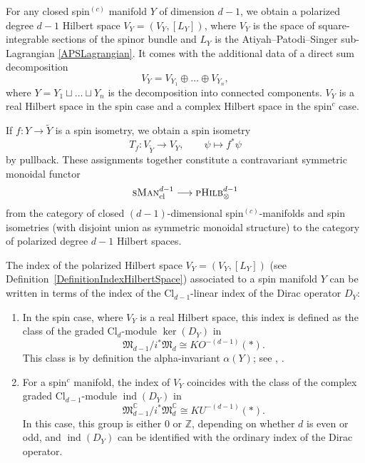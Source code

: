 \documentclass[10pt,a4paper]{amsart}
\numberwithin{equation}{section}
\newcommand{\pHilb}{\textsc{pHilb}}
\newcommand{\Z}{\mathbb{Z}}
\newcommand{\C}{\mathbb{C}}
\newcommand{\ind}{\operatorname{ind}}
\newcommand{\Cl}{\mathrm{Cl}}
\begin{document}
\begin{Construction} \label{ConstructionVX}
For any closed spin$^{(c)}$ manifold $Y$ of dimension $d-1$, we obtain a polarized degree $d-1$ Hilbert space $V_Y = (V_Y, [L_Y])$, where $V_Y$ is the space of square-integrable sections of the spinor bundle and $L_Y$ is the Atiyah--Patodi--Singer sub-Lagrangian \eqref{APSLagrangian}.
It comes with the additional data of a direct sum decomposition
\begin{equation}
\label{ObservationMonoidality}
 V_Y = V_{Y_1} \oplus \dots \oplus V_{Y_n},
\end{equation}
where $Y = Y_1 \sqcup \dots \sqcup Y_n$ is the decomposition into connected components.
$V_Y$ is a real Hilbert space in the spin case and a complex Hilbert space in the spin$^c$ case.

If $f\colon Y \to \tilde{Y}$ is a spin isometry, we obtain a spin isometry
\begin{equation}
\label{InducedIsomorphism}
 T_f\colon V_{\tilde{Y}} \to V_Y, \qquad \psi \longmapsto f^*\psi
\end{equation}
by pullback.
These assignments together constitute a contravariant symmetric monoidal functor
\begin{gather}
 \textsc{sMan}^{d-1}_{\mathrm{cl}} \longrightarrow \pHilb_\otimes^{d-1}\label{FunctorSManPHilb}
\end{gather}
from the category of closed $(d-1)$-dimensional spin$^{(c)}$-manifolds and spin isometries (with disjoint union as symmetric monoidal structure) to the category of polarized degree $d-1$ Hilbert spaces.
\end{Construction}


\begin{Remark}
The index of the polarized Hilbert space $V_Y = (V_Y, [L_Y])$ (see Definition~\ref{DefinitionIndexHilbertSpace}) associated to a spin manifold $Y$ can be written in terms of the index of the $\Cl_{d-1}$-linear index of the Dirac operator $D_Y$:
\begin{enumerate}\itemsep=0pt
\item[(a)]
In the spin case, where $V_Y$ is a real Hilbert space, this index is defined as the class of the graded $\Cl_d$-module $\ker(D_Y)$ in \[\mathfrak{M}_{d-1}/i^* \mathfrak{M}_{d} \cong KO^{-(d-1)}(*).\]
This class is by definition the alpha-invariant $\alpha(Y)$; see \cite[Section~4.2]{HitchinHarmonicSpinors}, \cite[Section~III.16]{LawsonMichelsohn}.
\item[(b)]
For a spin$^c$ manifold, the index of $V_Y$ coincides with the class of the complex graded $\Cl_{d-1}$-module $\ind(D_Y)$ in \[\mathfrak{M}_{d-1}^\C/i^* \mathfrak{M}_{d}^\C \cong KU^{-(d-1)}(*).\]
In this case, this group is either $0$ or $\Z$, depending on whether $d$ is even or odd, and $\ind(D_Y)$ can be identified with the ordinary index of the Dirac operator.
\end{enumerate}
\end{Remark}
\end{document}
